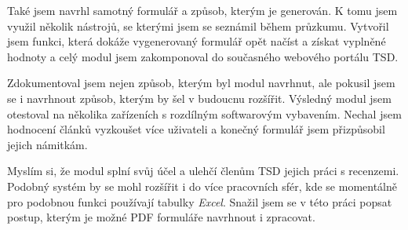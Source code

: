 \documentclass[czech,BP]{thesiskiv}
\begin{document}
Také jsem navrhl samotný formulář a způsob, kterým je generován. K tomu jsem využil několik nástrojů, se kterými jsem se seznámil během průzkumu. Vytvořil jsem funkci, která dokáže vygenerovaný formulář opět načíst a získat vyplněné hodnoty a celý modul jsem zakomponoval do současného webového portálu TSD. 

Zdokumentoval jsem nejen způsob, kterým byl modul navrhnut, ale pokusil jsem se i navrhnout způsob, kterým by šel v budoucnu rozšířit. Výsledný modul jsem otestoval na několika zařízeních s rozdílným softwarovým vybavením. Nechal jsem hodnocení článků vyzkoušet více uživateli a konečný formulář jsem přizpůsobil jejich námitkám. 

Myslím si, že modul splní svůj účel a ulehčí členům TSD jejich práci s recenzemi. Podobný systém by se mohl  rozšířit i do více pracovních sfér, kde se momentálně pro podobnou funkci používají tabulky \emph{Excel}. Snažil jsem se v této práci popsat postup, kterým je možné PDF formuláře navrhnout i zpracovat. 


{\raggedright\small

}
\end{document}
